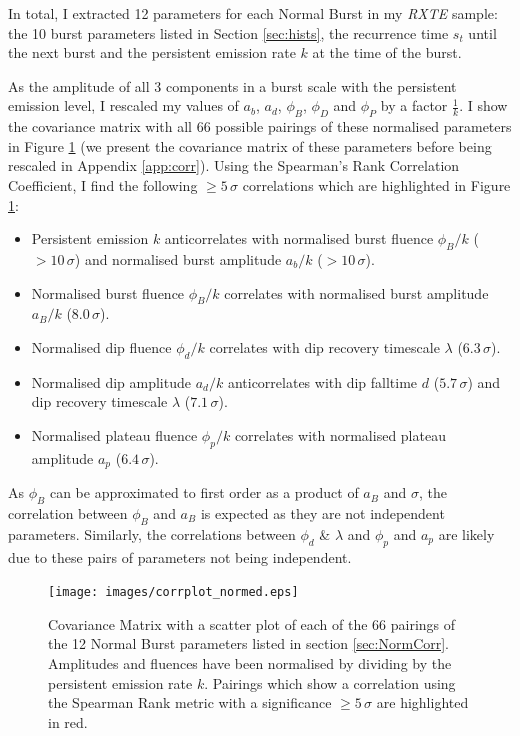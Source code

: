 \label{sec:NormCorr}

\par In total, I extracted 12 parameters for each Normal Burst in my \textit{RXTE} sample: the 10 burst parameters listed in Section \ref{sec:hists}, the recurrence time $s_t$ until the next burst and the persistent emission rate $k$ at the time of the burst.
\par As the amplitude of all 3 components in a burst scale with the persistent emission level, I rescaled my values of $a_b$, $a_d$, $\phi_B$, $\phi_D$ and $\phi_P$ by a factor $\frac{1}{k}$.  I show the covariance matrix with all 66 possible pairings of these normalised parameters in Figure \ref{fig:corr_n} (we present the covariance matrix of these parameters before being rescaled in Appendix \ref{app:corr}).  Using the Spearman's Rank Correlation Coefficient, I find the following $\geq5\,\sigma$ correlations which are highlighted in Figure \ref{fig:corr_n}:

\begin{itemize}
\item Persistent emission $k$ anticorrelates with normalised burst fluence $\phi_B/k$ ($>10\,\sigma$) and normalised burst amplitude $a_b/k$ ($>10\,\sigma$).
\item Normalised burst fluence $\phi_B/k$ correlates with normalised burst amplitude $a_B/k$ ($8.0\,\sigma$).
\item Normalised dip fluence $\phi_d/k$ correlates with dip recovery timescale $\lambda$ ($6.3\,\sigma$).
\item Normalised dip amplitude $a_d/k$ anticorrelates with dip falltime $d$ ($5.7\,\sigma$) and dip recovery timescale $\lambda$ ($7.1\,\sigma$).
\item Normalised plateau fluence $\phi_p/k$ correlates with normalised plateau amplitude $a_p$ ($6.4\,\sigma$).
\end{itemize}

As $\phi_B$ can be approximated to first order as a product of $a_B$ and $\sigma$, the correlation between $\phi_B$ and $a_B$ is expected as they are not independent parameters.  Similarly, the correlations between $\phi_d$ \& $\lambda$ and $\phi_p$ and $a_p$ are likely due to these pairs of parameters not being independent.

\begin{figure}
  \centering
  \texttt{[image: images/corrplot\_normed.eps]}
  \caption[Covariance Matrix with a scatter plot of each pairing of the 12 normalised Normal Burst parameters listed in section \ref{sec:NormCorr}.]{\small Covariance Matrix with a scatter plot of each of the 66 pairings of the 12 Normal Burst parameters listed in section \ref{sec:NormCorr}.  Amplitudes and fluences have been normalised by dividing by the persistent emission rate $k$.  Pairings which show a correlation using the Spearman Rank metric with a significance $\geq5\,\sigma$ are highlighted in red.}
  \label{fig:corr_n}
\end{figure}

